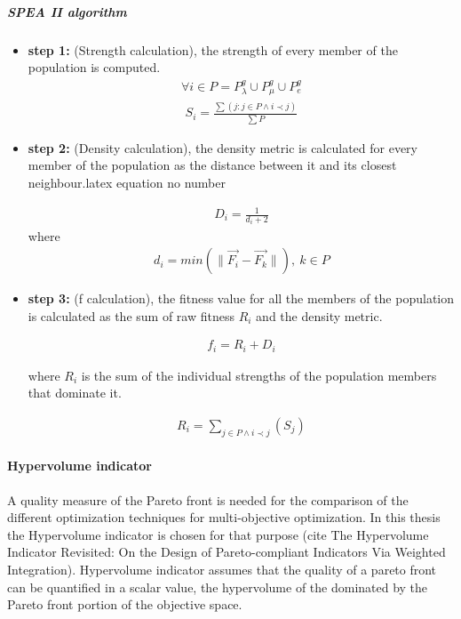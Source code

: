 \subparagraph{SPEA II algorithm}

\begin{itemize}
\item[]{\bf step 1:}  (Strength calculation), the strength of every member of the population is computed. 
\begin{eqnarray}
	\nonumber
	\forall i \in P = P_{\lambda}^g \cup P_{\mu}^g \cup P_{e}^g  
\end{eqnarray}
\begin{eqnarray}
	S_i = \frac{\sum(j : j \in P \wedge i \prec j)} {\sum P} 
\end{eqnarray}

\item[]{\bf step 2:}  (Density calculation), the density metric is calculated for every member of the population as the distance between it and its closest neighbour.latex equation no number

\begin{eqnarray}
	D_i = \frac{1} {d_i+2} 
\end{eqnarray}
where
\begin{eqnarray}
	\nonumber
	d_i= min (\parallel \overrightarrow{F_i} - \overrightarrow{F_k} \parallel), ~ k \in P  
\end{eqnarray}


\item[]{\bf step 3:}  (f calculation), the fitness value for all the members of the population is calculated as the sum of raw fitness $R_i$ and the density metric.

\begin{eqnarray}
	f_i = R_i+D_i
\end{eqnarray}

where $R_i$ is the sum of the individual strengths of the population members that dominate it.
  
\begin{eqnarray}
	\nonumber
	R_i=\sum _{j \in P \wedge i \prec j}(S_j)  
\end{eqnarray}  
\end{itemize}

\paragraph{Hypervolume indicator}
A quality measure of the Pareto front is needed for the comparison of the different optimization techniques for multi-objective optimization. In this thesis the Hypervolume indicator is chosen for that purpose (cite The Hypervolume Indicator Revisited: On the Design of Pareto-compliant Indicators Via Weighted Integration). Hypervolume indicator assumes that the quality of a pareto front can be quantified in a scalar value, the hypervolume of the dominated by the Pareto front portion of the objective space. 

